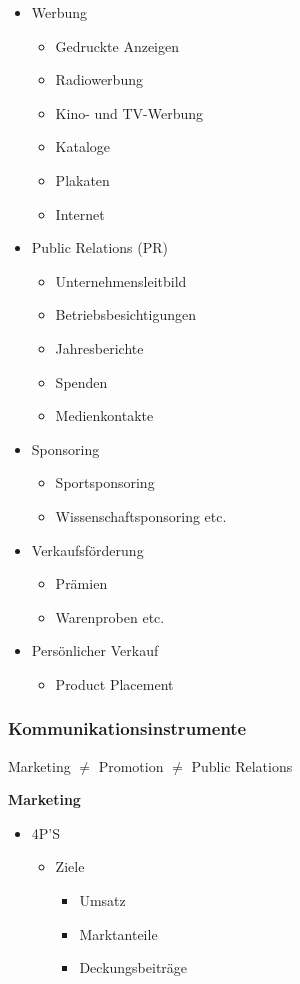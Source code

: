 \documentclass[../ZF_Wing.tex]{subfiles}
\begin{document}
\begin{itemize}
	\item Werbung
	\begin{itemize}
		\item Gedruckte Anzeigen
		\item Radiowerbung
		\item Kino- und TV-Werbung
		\item Kataloge
		\item Plakaten
		\item Internet
	\end{itemize}
	\item Public Relations (PR)
	\begin{itemize}
		\item Unternehmensleitbild
		\item Betriebsbesichtigungen
		\item Jahresberichte
		\item Spenden
		\item Medienkontakte
	\end{itemize}
	\item Sponsoring
	\begin{itemize}
		\item Sportsponsoring
		\item Wissenschaftsponsoring etc.
	\end{itemize}
	\item Verkaufsförderung
	\begin{itemize}
		\item Prämien
		\item Warenproben etc.
	\end{itemize}
	\item Persönlicher Verkauf
	\begin{itemize}
		\item Product Placement
	\end{itemize}
\end{itemize}


\subsubsection{Kommunikationsinstrumente}
Marketing $\neq$ Promotion $\neq$ Public Relations

\textbf{Marketing\\}
\begin{itemize}
	\item 4P'S
	\begin{itemize}
		\item Ziele
		\begin{itemize}
			\item Umsatz
			\item Marktanteile
			\item Deckungsbeiträge
		\end{itemize}
	\end{itemize}
\end{itemize}
\end{document}
